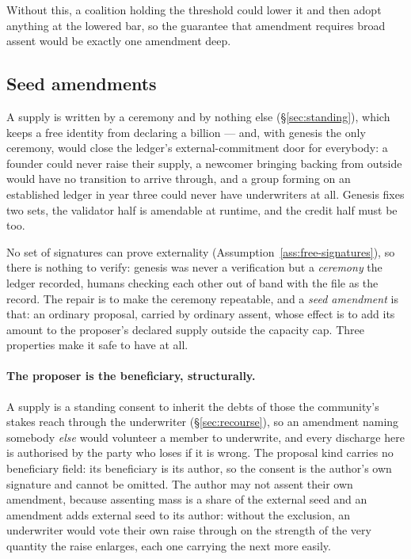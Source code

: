 Without this, a coalition holding the threshold could lower it and then adopt anything at
the lowered bar, so the guarantee that amendment requires broad assent would be exactly
one amendment deep.

\subsection{Seed amendments}
\label{sec:seed-amendments}

A supply is written by a ceremony and by nothing else (\S\ref{sec:standing}), which keeps
a free identity from declaring a billion --- and, with genesis the only ceremony, would
close the ledger's external-commitment door for everybody: a founder could never raise
their supply, a newcomer bringing backing from outside would have no transition to arrive
through, and a group forming on an established ledger in year three could never have
underwriters at all. Genesis fixes two sets, the validator half is amendable at runtime,
and the credit half must be too.

No set of signatures can prove externality (Assumption~\ref{ass:free-signatures}), so
there is nothing to verify: genesis was never a verification but a \emph{ceremony} the
ledger recorded, humans checking each other out of band with the file as the record. The
repair is to make the ceremony repeatable, and a \emph{seed amendment} is that: an
ordinary proposal, carried by ordinary assent, whose effect is to add its amount to the
proposer's declared supply outside the capacity cap. Three properties make it safe to
have at all.

\paragraph{The proposer is the beneficiary, structurally.} A supply is a standing consent
to inherit the debts of those the community's stakes reach through the underwriter
(\S\ref{sec:recourse}), so an amendment naming somebody \emph{else} would volunteer a
member to underwrite, and every discharge here is authorised by the party who loses if it
is wrong. The proposal kind carries no beneficiary field: its beneficiary is its author,
so the consent is the author's own signature and cannot be omitted. The author may not
assent their own amendment, because assenting mass is a share of the external seed and an
amendment adds external seed to its author: without the exclusion, an underwriter would
vote their own raise through on the strength of the very quantity the raise enlarges, each
one carrying the next more easily.

